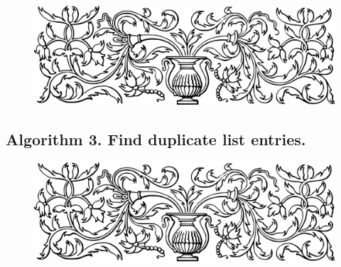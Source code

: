 \documentclass[preview]{standalone}
\begin{document}
\begin{figure}[!h]
    \centering
    \includegraphics[width=14cm]{../resources/jpg/3.1.algorithms/border1.png}
\end{figure}
\subsection[Find duplicate list entries.]{
    \color{section} Algorithm 3. \color{black} Find duplicate list entries.
}
\vspace{-1\baselineskip}

\begin{center}
    
\end{center}
\begin{center}
    
\end{center}
\pagebreak


\begin{figure}[!h]
    \centering
    \includegraphics[width=14cm]{../resources/jpg/3.1.algorithms/border1.png}
\end{figure}
\end{document}
